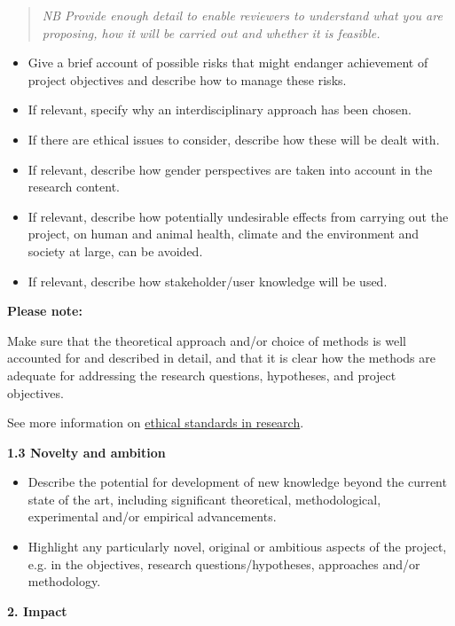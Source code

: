 \documentclass{nfr}
\begin{document}
\begin{quote}
\emph{NB Provide enough detail to enable reviewers to understand what
you are proposing, how it will be carried out and whether it is
feasible.}
\end{quote}

\begin{itemize}
\item
  Give a brief account of possible risks that might endanger achievement
  of project objectives and describe how to manage these risks.
\item
  If relevant, specify why an interdisciplinary approach has been
  chosen.
\item
  If there are ethical issues to consider, describe how these will be
  dealt with.
\item
  If relevant, describe how gender perspectives are taken into account
  in the research content.
\item
  If relevant, describe how potentially undesirable effects from
  carrying out the project, on human and animal health, climate and the
  environment and society at large, can be avoided.
\item
  If relevant, describe how stakeholder/user knowledge will be used.
\end{itemize}

\textbf{Please note:}

Make sure that the theoretical approach and/or choice of methods is well
accounted for and described in detail, and that it is clear how the
methods are adequate for addressing the research questions, hypotheses,
and project objectives.

See more information on
\href{https://www.forskningsradet.no/en/research-policy-strategy/ethical-standards/}{ethical
standards in research}.

\textbf{1.3 Novelty and ambition}

\begin{itemize}
\item
  Describe the potential for development of new knowledge beyond the
  current state of the art, including significant theoretical,
  methodological, experimental and/or empirical advancements.
\item
  Highlight any particularly novel, original or ambitious aspects of the
  project, e.g. in the objectives, research questions/hypotheses,
  approaches and/or methodology.
\end{itemize}

\textbf{2. Impact}
\end{document}
